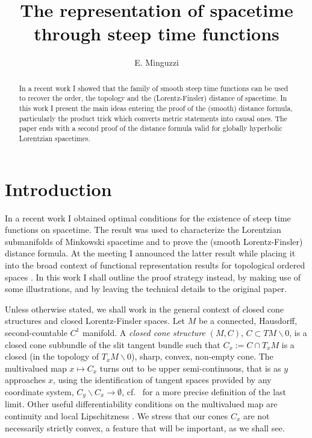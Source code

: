 \documentclass[a4paper]{jpconf}
\theoremstyle{definition}
\theoremstyle{remark}
\begin{document}

\title{The representation of spacetime through steep time functions}
\author{E. Minguzzi}

\address{Dipartimento di Matematica e Informatica ``U. Dini'', Universit\`a degli Studi di Firenze,  Via
S. Marta 3,  I-50139 Firenze, Italy}


\begin{abstract}
In a recent work I showed that  the family of smooth steep time functions can be used to recover the order, the topology and the (Lorentz-Finsler) distance of spacetime. In this work I present  the main ideas entering the proof of the (smooth) distance formula, particularly the product trick which converts metric statements into causal ones. The paper ends with a second proof of the  distance formula valid for globally hyperbolic Lorentzian spacetimes.
\end{abstract}


\section{Introduction}
In a recent work \cite{minguzzi17} I  obtained optimal conditions for the existence of steep time functions on spacetime.  The result was used to characterize the Lorentzian submanifolds of Minkowski spacetime and to prove the (smooth Lorentz-Finsler) distance formula. At the meeting  I announced the latter result while placing it into the broad context of functional representation results for topological ordered spaces \cite{nachbin65,minguzzi12d}. In this work  I shall outline the proof strategy instead, by making use of some illustrations, and by leaving the technical details to the original paper.

Unless otherwise stated, we shall work in the general context of closed cone structures and closed Lorentz-Finsler spaces. Let $M$ be a  connected, Hausdorff, second-countable $C^1$ manifold.
A {\em closed cone structure} $(M,C)$, $C\subset TM\backslash 0$, is a closed cone subbundle of the slit tangent bundle such that $C_x:=C\cap T_{x}M$ is a closed (in the topology of $T_xM\backslash 0$), sharp, convex, non-empty cone. The multivalued map $x \mapsto C_x$ turns out to be upper semi-continuous, that is as $y$ approaches $x$, using the identification of tangent spaces provided by any coordinate system, $C_y\backslash C_x\to \emptyset$, cf.\ \cite{aubin84,minguzzi17} for a more precise definition of the last limit. Other useful differentiability conditions on the multivalued map are continuity and local Lipschitzness \cite{fathi12,minguzzi17}. We stress that our cones $C_x$ are not necessarily strictly convex, a feature that will be important, as we shall see.
\end{document}
